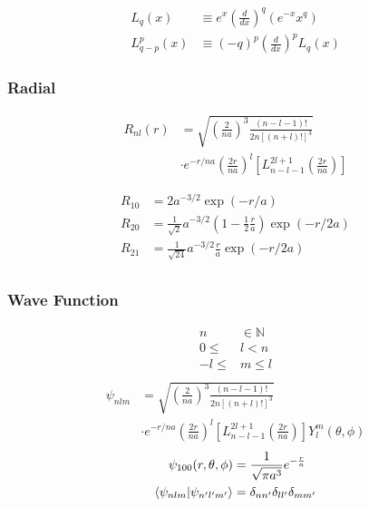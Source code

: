\documentclass[8pt]{amsart}
\newcommand{\der}[2][]{\frac{d#1}{d#2}}
\newcommand{\N}{\mathbb{N}}
\begin{document}
\begin{multicols}{3}
\begin{align*}
  L_q(x)&\equiv e^x\left(\der{x}\right)^q(e^{-x}x^q)\\
  L_{q-p}^p(x)&\equiv(-q)^p\left(\der{x}\right)^pL_q(x)
\end{align*}

\subsubsection{Radial}%
\label{ssub:radial}

\begin{align*}
  R_{nl}(r)&=\sqrt{\left(\frac{2}{na}\right)^3\frac{(n-l-1)!}{2n\left[(n+l)!\right]^3}}\\ &\cdot e^{-r/na}\left(\frac{2r}{na}\right)^l\left[L_{n-l-1}^{2l+1}\left(\frac{2r}{na}\right)\right]
\end{align*}

\begin{align*}
  R_{10}&=2a^{-3/2}\exp(-r/a)\\
  R_{20}&=\frac{1}{\sqrt{2}}a^{-3/2}\left(1-\frac{1}{2}\frac{r}{a}\right)\exp(-r/2a)\\
  R_{21}&=\frac{1}{\sqrt{24}}a^{-3/2}\frac{r}{a}\exp(-r/2a)\\
\end{align*}

\subsubsection{Wave Function}%
\label{ssub:wave_function}

\begin{align*}
  n&\in\N\\
  0\leq &l < n\\
  -l\leq &m \leq l\\
\end{align*}
\begin{align*}
  \psi_{nlm}&=\sqrt{\left(\frac{2}{na}\right)^3\frac{(n-l-1)!}{2n\left[(n+l)!\right]^3}}\\
             &\cdot e^{-r/na}\left(\frac{2r}{na}\right)^l\left[L_{n-l-1}^{2l+1}\left(\frac{2r}{na}\right)\right]Y_l^m(\theta,\phi)
\end{align*}
\begin{align*}
  \psi_{100}(r,\theta,\phi)&=\frac{1}{\sqrt{\pi a^3}}e^{-\frac{r}{a}}\\
  \braket{\psi_{nlm}}{\psi_{n'l'm'}}&=\delta_{nn'}\delta_{ll'}\delta_{mm'}
\end{align*}


\end{multicols}
\end{document}
